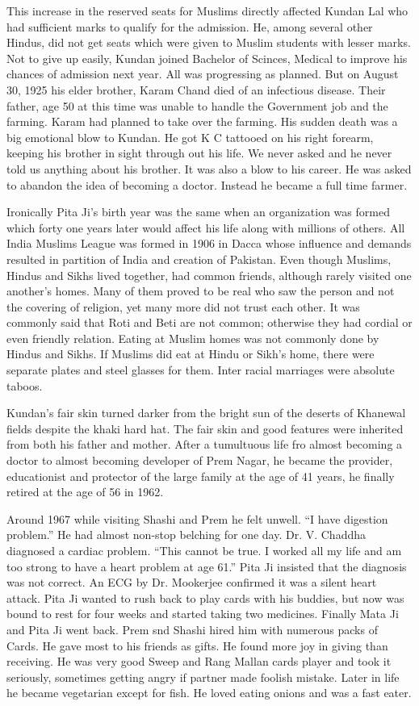 This increase in the reserved seats for Muslims directly affected Kundan Lal who had sufficient marks to qualify for the admission. He, among several other Hindus, did not get seats which were given to Muslim students with lesser marks. 
Not to give up easily, Kundan joined Bachelor of Scinces, Medical to improve his chances of admission next year. 
All was progressing as planned. But on August 30, 1925 his elder brother, Karam Chand died of an infectious disease. Their father, age 50 at this time was unable to handle the Government job and the farming. Karam had planned to take over the farming. His sudden death was a big emotional blow to Kundan. He got K C tattooed on his right forearm, keeping his brother in sight through out his life. We never asked and he never told us anything about his brother. It was also a blow to his career. He was asked to abandon the idea of becoming a doctor. Instead he became a full time farmer. 

Ironically Pita Ji’s birth year was the same when an organization was formed which forty one years later would affect his life along with millions of others. All India Muslims League was formed in 1906 in Dacca whose influence and demands resulted in partition of India and creation of Pakistan. Even though Muslims, Hindus and Sikhs lived together, had common friends, although rarely visited one another’s homes. Many of them proved to be real who saw the person and not the covering of religion, yet many more did not trust each other. It was commonly said that Roti and Beti are not common; otherwise they had cordial or even friendly relation. Eating at Muslim homes was not commonly done by Hindus and Sikhs. If Muslims did eat at Hindu or Sikh’s home, there were separate plates and steel glasses for them. Inter racial marriages were absolute taboos. 

Kundan’s fair skin turned darker from the bright sun of the deserts of  Khanewal fields despite the khaki hard hat. The fair skin and good features were inherited from both his father and mother.  
After a tumultuous life fro almost becoming a doctor to almost becoming developer of Prem Nagar, he became the provider, educationist and protector of the large family at the age of 41 years, he finally retired at the age of 56 in 1962. 

Around 1967 while visiting Shashi and Prem he felt unwell. “I have digestion problem.” He had almost non-stop belching for one day. Dr. V. Chaddha diagnosed a cardiac problem. “This cannot be true. I worked all my life and am too strong to have a heart problem at age 61.”
Pita Ji insisted that the diagnosis was not correct. An ECG by Dr. Mookerjee confirmed it was a silent heart attack. Pita Ji wanted to rush back to play cards with his buddies, but now was bound to rest for four weeks and started taking two medicines. Finally Mata Ji and Pita Ji went back. Prem snd Shashi hired him with numerous packs of Cards. He gave most to his friends as gifts. He found more joy in giving than receiving. He was very good Sweep and Rang Mallan cards player and took it seriously, sometimes getting angry if partner made foolish mistake. 
Later in life he became vegetarian except for fish. 
He loved eating onions and was a fast eater. 

